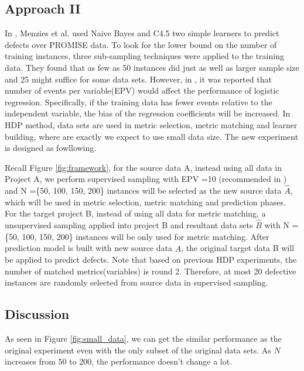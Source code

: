 \subsection{Approach II}

In \cite{menzies2008implications}, Menzies et al. used Naive Bayes and C4.5 two simple learners to predict defects over PROMISE data. To look for the lower bound on the number of training instances, three sub-sampling techniques were applied to the training data. They found that as few as 50 instances did just as well as larger sample size and 25 might suffice for some data sets. However, in \cite{peduzzi1996simulation}, it was reported that number of events per variable(EPV) would affect the performance of logistic regression. Specifically, if the training data has fewer events relative to the independent variable, the bias of the regression coefficients will be increased.  In HDP method, data sets are used in metric selection, metric matching and learner building, where are exactly we expect to use small data size. The new experiment is designed as fowllowing.

Recall Figure \ref{fig:framework}, for the source data A, instead using all data in Project A, we perform supervised sampling with EPV =10 (recommended in \cite{peduzzi1996simulation})  and N =\{50, 100, 150, 200\} instances will be selected as the new source data ${\hat A}$, which will be used in metric selection, metric matching and prediction phases. For the target project B, instead of using all data for metric matching, a unsupervised sampling applied into project B and resultant data sets ${\hat B}$ with N = \{50, 100, 150, 200\} instances will be only used for metric matching. After prediction model is built with new source data $\hat A$, the original target data B will be applied to predict defects. Note that based on previous HDP experiments, the number of matched metrics(variables) is round 2. Therefore, at most 20 defective instances are randomly selected from source data in supervised sampling.

\subsection{Discussion}
As seen in Figure \ref{fig:small_data}, we can get the similar performance as the original experiment even with the only subset of the original data sets. As $N$ increases from 50 to 200, the performance doesn't change a lot.


